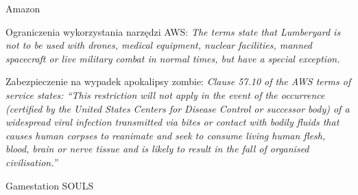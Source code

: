 \begin{frame}{Amazon}
    \begin{block}{Ograniczenia wykorzystania narzędzi AWS:}
        \emph{The terms state that Lumberyard is not to be used with drones, medical equipment, nuclear facilities, manned spacecraft or live military combat in normal times, but have a special exception.}   
    \end{block}  
    \pause
    \begin{block}{Zabezpieczenie na wypadek apokalipsy zombie:}
        \emph{Clause 57.10 of the AWS terms of service states: “This restriction will not apply in the event of the occurrence (certified by the United States Centers for Disease Control or successor body) 
        of a widespread viral infection transmitted via bites or contact with bodily fluids that causes human corpses to reanimate and seek to consume living human flesh, blood, brain or nerve tissue and is 
        likely to result in the fall of organised civilisation.”} \cite{GUARDIAN_AWS_ZOMBIE}   
    \end{block}      
\end{frame}

\begin{frame}{Gamestation}
    SOULS \cite{Soul_EULA}     
\end{frame}

    
    